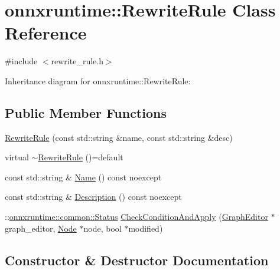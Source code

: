 \hypertarget{classonnxruntime_1_1RewriteRule}{}\section{onnxruntime\+:\+:Rewrite\+Rule Class Reference}
\label{classonnxruntime_1_1RewriteRule}


{\ttfamily \#include $<$rewrite\+\_\+rule.\+h$>$}



Inheritance diagram for onnxruntime\+:\+:Rewrite\+Rule\+:
\subsection*{Public Member Functions}
\begin{DoxyCompactItemize}
\item 
\mbox{\hyperlink{classonnxruntime_1_1RewriteRule_a3fa857ff053c83ddb4bf5feddaf270db}{Rewrite\+Rule}} (const std\+::string \&name, const std\+::string \&desc)
\item 
virtual \mbox{\hyperlink{classonnxruntime_1_1RewriteRule_a965539324a76c8ae0e4c019fe6efbd1e}{$\sim$\+Rewrite\+Rule}} ()=default
\item 
const std\+::string \& \mbox{\hyperlink{classonnxruntime_1_1RewriteRule_a64f78e1ac1ffefb29f37e66f892dcc40}{Name}} () const noexcept
\item 
const std\+::string \& \mbox{\hyperlink{classonnxruntime_1_1RewriteRule_aafea189c5808aa548e21b59650406357}{Description}} () const noexcept
\item 
\+::\mbox{\hyperlink{classonnxruntime_1_1common_1_1Status}{onnxruntime\+::common\+::\+Status}} \mbox{\hyperlink{classonnxruntime_1_1RewriteRule_acdd4eadfe4aca121e3912dc12bd82f17}{Check\+Condition\+And\+Apply}} (\mbox{\hyperlink{classonnxruntime_1_1GraphEditor}{Graph\+Editor}} $\ast$graph\+\_\+editor, \mbox{\hyperlink{classonnxruntime_1_1Node}{Node}} $\ast$node, bool $\ast$modified)
\end{DoxyCompactItemize}


\subsection{Constructor \& Destructor Documentation}
\mbox{\label{classonnxruntime_1_1RewriteRule_a3fa857ff053c83ddb4bf5feddaf270db}} 
